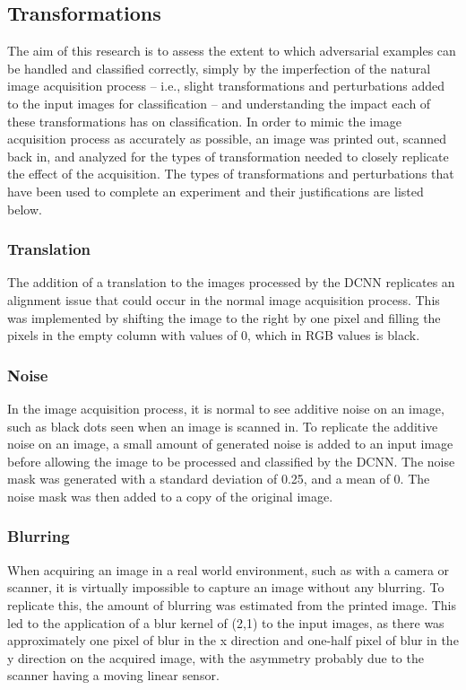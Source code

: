 \documentclass[conference]{IEEEtran}
\begin{document}
\subsection{Transformations}
The aim of this research is to assess the extent to which adversarial examples can be handled and classified correctly, simply by the imperfection of the natural image acquisition process -- i.e., slight transformations and perturbations added to the input images for classification -- and understanding the impact each of these transformations has on classification. In order to mimic the image acquisition process as accurately as possible, an image was printed out, scanned back in, and analyzed for the types of transformation needed to closely replicate the effect of the acquisition. The types of transformations and perturbations that have been used to complete an experiment and their justifications are listed below.

\subsubsection{Translation}
The addition of a translation to the images processed by the DCNN replicates an alignment issue that could occur in the normal image acquisition process.  This was implemented by shifting the image to the right by one pixel and filling the pixels in the empty column with values of 0, which in RGB values is black.

\subsubsection{Noise}
In the image acquisition process, it is normal to see additive noise on an image, such as black dots seen when an image is scanned in.  To replicate the additive noise on an image, a small amount of generated noise is added to an input image before allowing the image to be processed and classified by the DCNN.  The noise mask was generated with a standard deviation of 0.25, and a mean of 0.  The noise mask was then added to a copy of the original image.

\subsubsection{Blurring} 
When acquiring an image in a real world environment, such as with a camera or scanner, it is virtually impossible to capture an image without any blurring. To replicate this, the amount of blurring was estimated from the printed image.  This led to the application of a blur kernel of (2,1) to the input images, as there was approximately one pixel of blur in the x direction and one-half pixel of blur in the y direction on the acquired image, with the asymmetry probably due to the scanner having a moving linear sensor.  
\end{document}
